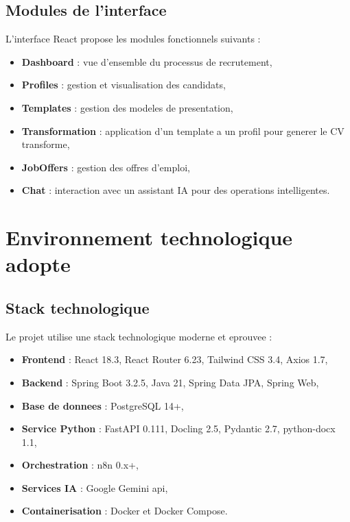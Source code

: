 \subsection{Modules de l'interface}

L'interface React propose les modules fonctionnels suivants :

\begin{itemize}
    \item \textbf{Dashboard} : vue d'ensemble du processus de recrutement,
    \item \textbf{Profiles} : gestion et visualisation des candidats,
    \item \textbf{Templates} : gestion des modeles de presentation,
    \item \textbf{Transformation} : application d'un template a un profil pour generer le CV transforme,
    \item \textbf{JobOffers} : gestion des offres d'emploi,
    \item \textbf{Chat} : interaction avec un assistant IA pour des operations intelligentes.
\end{itemize}

\section{Environnement technologique adopte}

\subsection{Stack technologique}

Le projet utilise une stack technologique moderne et eprouvee :

\begin{itemize}
    \item \textbf{Frontend} : React 18.3, React Router 6.23, Tailwind CSS 3.4, Axios 1.7,
    
    \item \textbf{Backend} : Spring Boot 3.2.5, Java 21, Spring Data JPA, Spring Web,
    
    \item \textbf{Base de donnees} : PostgreSQL 14+,
    
    \item \textbf{Service Python} : FastAPI 0.111, Docling 2.5, Pydantic 2.7, python-docx 1.1,
    
    \item \textbf{Orchestration} : n8n 0.x+,
    
    \item \textbf{Services IA} : Google Gemini \acrfull{api},
    
    \item \textbf{Containerisation} : Docker et Docker Compose.
\end{itemize}

